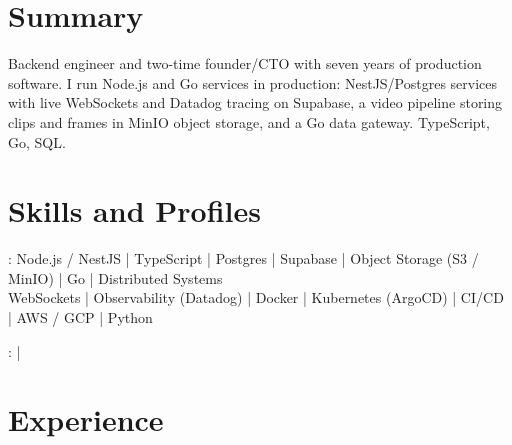 \documentclass[print]{jack-resume}
\begin{document}
\pagecolor{darkmodeBackground}


\begin{minipage}[t][1cm][t]{.03\textwidth}
    \hfill
\end{minipage}

\section{Summary}
Backend engineer and two-time founder/CTO with seven years of production software. I run Node.js and Go services in production: NestJS/Postgres services with live WebSockets and Datadog tracing on Supabase, a video pipeline storing clips and frames in MinIO object storage, and a Go data gateway. TypeScript, Go, SQL.
\sectionsep

\section{Skills and Profiles}
:
Node.js / NestJS \hfill | \hfill
TypeScript \hfill | \hfill
Postgres \hfill | \hfill
Supabase \hfill | \hfill
Object Storage (S3 / MinIO) \hfill | \hfill
Go \hfill | \hfill
Distributed Systems \\
\hspace{1.0cm} WebSockets \hfill | \hfill
Observability (Datadog) \hfill | \hfill
Docker \hfill | \hfill
Kubernetes (ArgoCD) \hfill | \hfill
CI/CD \hfill | \hfill
AWS / GCP \hfill | \hfill
Python \\

\raggedright{
    :
      \href{https://www.linkedin.com/in/jack-sturtevant/}{ \ExternalLink} |
     \href{https://github.com/jacksturt}{ \ExternalLink}}

\section{Experience}
\end{document}
